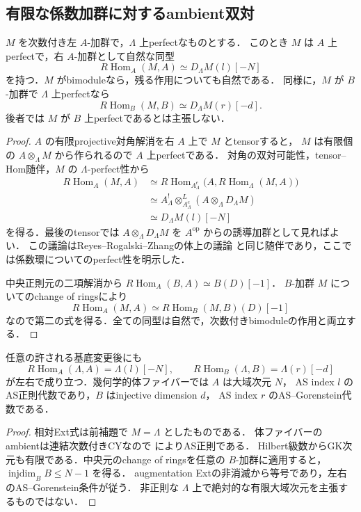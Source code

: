 \subsection{有限な係数加群に対するambient双対}
\begin{lemma}\label{lem:relative-proper-module-duality}
$M$ を次数付き左 $A$-加群で，$\Lambda$ 上perfectなものとする．
このとき $M$ は $A$ 上perfectで，右 $A$-加群として自然な同型
\[
 R\!\operatorname{Hom}_A(M,A)
       \simeq D_\Lambda M(l)[-N]
\]
を持つ．$M$ がbimoduleなら，残る作用についても自然である．
同様に，$M$ が $B$-加群で $\Lambda$ 上perfectなら
\[
 R\!\operatorname{Hom}_B(M,B)
       \simeq D_\Lambda M(r)[-d].
\]
後者では $M$ が $B$ 上perfectであるとは主張しない．
\end{lemma}
\begin{proof}
$A$ の有限projective対角解消を右 $A$ 上で $M$ とtensorすると，
$M$ は有限個の $A\otimes_\Lambda M$ から作られるので $A$ 上perfectである．
対角の双対可能性，tensor--Hom随伴，$M$ の $\Lambda$-perfect性から
\begin{align*}
 R\!\operatorname{Hom}_A(M,A)
 &\simeq R\!\operatorname{Hom}_{A^e_\Lambda}
       \bigl(A,R\!\operatorname{Hom}_\Lambda(M,A)\bigr)\\
 &\simeq A^!_\Lambda\otimes^L_{A^e_\Lambda}
             (A\otimes_\Lambda D_\Lambda M)\\
 &\simeq D_\Lambda M(l)[-N]
\end{align*}
を得る．最後のtensorでは $A\otimes_\Lambda D_\Lambda M$ を
$A^{\mathrm{op}}$ からの誘導加群として見ればよい．
この議論はReyes--Rogalski--Zhangの体上の議論
\cite[Lemma 1.2]{RRZ2014}と同じ随伴であり，ここでは係数環についてのperfect性を明示した．

中央正則元の二項解消から
$R\!\operatorname{Hom}_A(B,A)\simeq B(D)[-1]$．
$B$-加群 $M$ についてのchange of ringsにより
\[
 R\!\operatorname{Hom}_A(M,A)
 \simeq R\!\operatorname{Hom}_B(M,B)(D)[-1]
\]
なので第二の式を得る．全ての同型は自然で，次数付きbimoduleの作用と両立する．
\end{proof}

\begin{corollary}\label{cor:finite-relative-augmentation-ext}
任意の許される基底変更後にも
\[
 R\!\operatorname{Hom}_A(\Lambda,A)=\Lambda(l)[-N],\qquad
 R\!\operatorname{Hom}_B(\Lambda,B)=\Lambda(r)[-d]
\]
が左右で成り立つ．幾何学的体ファイバーでは $A$ は大域次元 $N$，
AS index $l$ のAS正則代数であり，$B$ はinjective dimension $d$，
AS index $r$ のAS--Gorenstein代数である．
\end{corollary}
\begin{proof}
相対Ext式は前補題で $M=\Lambda$ としたものである．
体ファイバーのambientは連結次数付きCYなので
\cite[Lemma 1.2]{RRZ2014}によりAS正則である．
Hilbert級数からGK次元も有限である．中央元のchange of ringsを任意の $B$-加群に適用すると，
$\operatorname{injdim}_B B\le N-1$ を得る．
augmentation Extの非消滅から等号であり，左右のAS--Gorenstein条件が従う．
非正則な $\Lambda$ 上で絶対的な有限大域次元を主張するものではない．
\end{proof}

